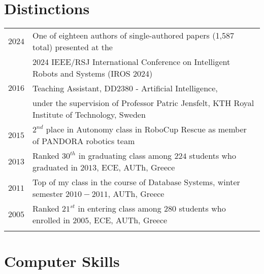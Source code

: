 \documentclass[a4paper,10pt,twoside]{article}
\begin{document}
\section{Distinctions}
\begin{tabular}{rl}

$2024$ & One of eighteen authors of single-authored papers (1,587 total) presented at the \\ &
         2024 IEEE/RSJ International Conference on Intelligent Robots and Systems (IROS 2024) \\


$2016$ & Teaching Assistant, DD2380 - Artificial Intelligence, \\ & under the
supervision of Professor Patric Jensfelt, KTH Royal Institute of Technology, Sweden \\


$2015$ & $2^{nd}$ place in Autonomy class in RoboCup Rescue as member of PANDORA robotics team \\


$2013$ & Ranked $30^{th}$ in graduating class among $224$ students who graduated in $2013$, ECE, AUTh, Greece \\


$2011$ & Top of my class in the course of Database Systems, winter semester $2010 - 2011$,
AUTh, Greece \\


$2005$ & Ranked $21^{st}$ in entering class among $280$ students who enrolled in $2005$, ECE, AUTh, Greece\\
&\\
\end{tabular}

\section{Computer Skills}
\end{document}
